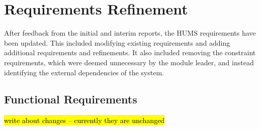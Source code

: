 \documentclass[10pt,a4paper]{article}
\begin{document}
\section{Requirements Refinement}
\label{sec:requirements}
After feedback from the initial and interim reports, the HUMS requirements have been updated. This included modifying existing requirements and adding additional requirements and refinements. It also included removing the constraint requirements, which were deemed unnecessary by the module leader, and instead identifying the external dependencies of the system.

\subsection{Functional Requirements}
\label{sec:functional_requirements}
\hl{write about changes -- currently they are unchanged} 
\end{document}
